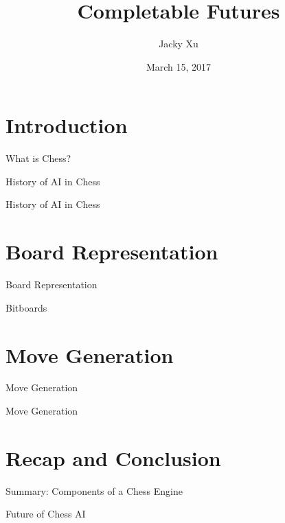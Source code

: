 \documentclass[xcolor=pdftex,dvipsnames,table]{beamer}
\title[Completable Futures]{Completable Futures}
\author{Jacky Xu}
\institute{RBC I\&TS}
\date{March 15, 2017}
\begin{document}
\begin{frame}
  \titlepage
\end{frame}


\section{Introduction}

\begin{frame}{What is Chess?}
\end{frame}

\begin{frame}{History of AI in Chess}
\end{frame}


\begin{frame}{History of AI in Chess}
\end{frame}

\section{Board Representation}

\begin{frame}{Board Representation}
\end{frame}

\begin{frame}{Bitboards}
\end{frame}

\section{Move Generation}

\begin{frame}{Move Generation}
\end{frame}

\begin{frame}[fragile]{Move Generation}
\end{frame}

\section{Recap and Conclusion}

\begin{frame}{Summary: Components of a Chess Engine}
\end{frame}

\begin{frame}{Future of Chess AI}
\end{frame}
\end{document}
